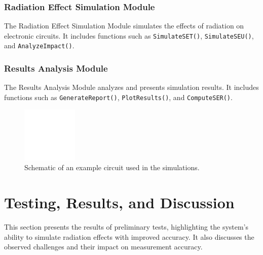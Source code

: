 \documentclass[conference]{IEEEtran}
\begin{document}
\subsubsection{Radiation Effect Simulation Module}
The Radiation Effect Simulation Module simulates the effects of radiation on electronic circuits. It includes functions such as \texttt{SimulateSET()}, \texttt{SimulateSEU()}, and \texttt{AnalyzeImpact()}.

\subsubsection{Results Analysis Module}
The Results Analysis Module analyzes and presents simulation results. It includes functions such as \texttt{GenerateReport()}, \texttt{PlotResults()}, and \texttt{ComputeSER()}.

\begin{figure}[htbp]
\centering
\includegraphics[width=0.8\linewidth]{example_circuit_placeholder.png}
\caption{Schematic of an example circuit used in the simulations.}
\label{fig:example_circuit}
\end{figure}

\section{Testing, Results, and Discussion}
This section presents the results of preliminary tests, highlighting the system's ability to simulate radiation effects with improved accuracy. It also discusses the observed challenges and their impact on measurement accuracy.
\end{document}
